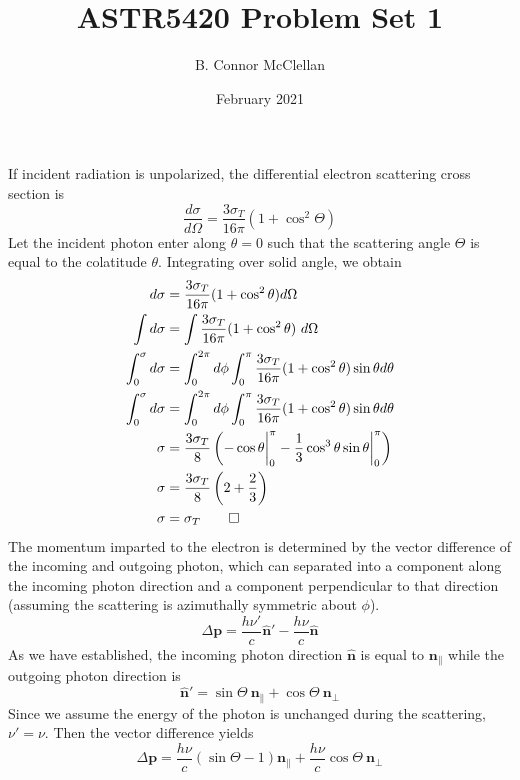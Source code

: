 \documentclass{article}
\title{ASTR5420 Problem Set 1}
\author{B. Connor McClellan}
\date{February 2021}
\begin{document}
\maketitle


\section{}
If incident radiation is unpolarized, the differential electron scattering cross section is
%
\begin{equation}
    \frac{d\sigma}{d\Omega} = \frac{3 \sigma_T}{16\pi}(1 + \cos^2 \Theta)
\end{equation}
%
Let the incident photon enter along $\theta=0$ such that the scattering angle $\Theta$ is equal to the colatitude $\theta$.  Integrating over solid angle, we obtain
%
\begin{equation}
    \begin{split}
        d\sigma &= \frac{3 \sigma_T}{16\pi}(1 + \cos^2 \theta) d\Omega\\
        \int d\sigma &= \int \frac{3 \sigma_T}{16\pi}(1 + \cos^2 \theta)\ d\Omega \\
        \int_0^\sigma d\sigma &= \int_0^{2\pi}d\phi\int_0^\pi \frac{3 \sigma_T}{16\pi}(1 + \cos^2 \theta)\sin \theta d\theta \\
        \int_0^\sigma d\sigma &= \int_0^{2\pi}d\phi\int_0^\pi \frac{3 \sigma_T}{16\pi}(1 + \cos^2 \theta)\sin \theta d\theta \\
        \sigma &= \frac{3 \sigma_T}{8} \left( -\cos \theta \bigg\rvert_0^\pi - \frac{1}{3}\cos^3 \theta \sin \theta \bigg\rvert_0^\pi\right)\\
        \sigma &= \frac{3 \sigma_T}{8} \left(2 + \frac{2}{3}\right)\\
        \sigma &= \sigma_T \qed
    \end{split}
\end{equation}
%
The momentum imparted to the electron is determined by the vector difference of the incoming and outgoing photon, which can separated into a component along the incoming photon direction and a component perpendicular to that direction (assuming the scattering is azimuthally symmetric about $\phi$).
%
\begin{equation}
    \Delta \mathbf{p} = \frac{h\nu'}{c} \mathbf{\hat n'} - \frac{h\nu}{c}\mathbf{\hat n}
\end{equation}
%
As we have established, the incoming photon direction $\mathbf{\hat n}$ is equal to $\mathbf{n_\parallel}$ while the outgoing photon direction is 
%
\begin{equation}
    \mathbf{\hat n'} = \sin \Theta \ \mathbf{n_\parallel} + \cos \Theta\  \mathbf{n_\perp}
\end{equation}
%
Since we assume the energy of the photon is unchanged during the scattering, $\nu' = \nu$. Then the vector difference yields
%
\begin{equation}
    \Delta \mathbf{p} = \frac{h\nu}{c}\left(\sin \Theta - 1\right) \mathbf{n_\parallel} + \frac{h\nu}{c}\cos \Theta \ \mathbf{n_\perp}
\end{equation}
\end{document}
